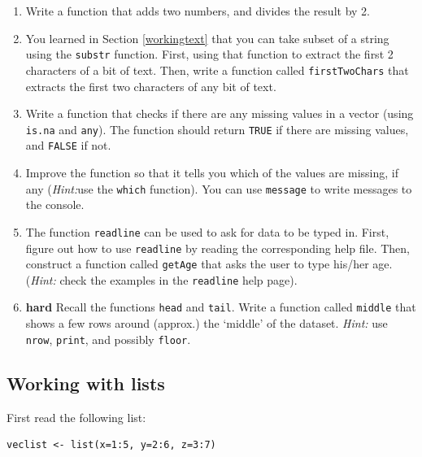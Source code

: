 \documentclass[]{book}
\begin{document}
\begin{enumerate}
\def\labelenumi{\arabic{enumi}.}
\item
  Write a function that adds two numbers, and divides the result by 2.
\item
  You learned in Section \ref{workingtext} that you can take subset of a string using the \texttt{substr} function. First, using that function to extract the first 2 characters of a bit of text. Then, write a function called \texttt{firstTwoChars} that extracts the first two characters of any bit of text.
\item
  Write a function that checks if there are any missing values in a vector (using \texttt{is.na} and \texttt{any}). The function should return \texttt{TRUE} if there are missing values, and \texttt{FALSE} if not.
\item
  Improve the function so that it tells you which of the values are missing, if any (\emph{Hint:}use the \texttt{which} function). You can use \texttt{message} to write messages to the console.
\item
  The function \texttt{readline} can be used to ask for data to be typed in. First, figure out how to use \texttt{readline} by reading the corresponding help file. Then, construct a function called \texttt{getAge} that asks the user to type his/her age. (\emph{Hint:} check the examples in the \texttt{readline} help page).
\item
  \textbf{hard} Recall the functions \texttt{head} and \texttt{tail}. Write a function called \texttt{middle} that shows a few rows around (approx.) the `middle' of the dataset. \emph{Hint:} use \texttt{nrow}, \texttt{print}, and possibly \texttt{floor}.
\end{enumerate}

\hypertarget{working-with-lists}{%
\subsection{Working with lists}\label{working-with-lists}}

First read the following list:

\begin{verbatim}
veclist <- list(x=1:5, y=2:6, z=3:7)
\end{verbatim}
\end{document}
